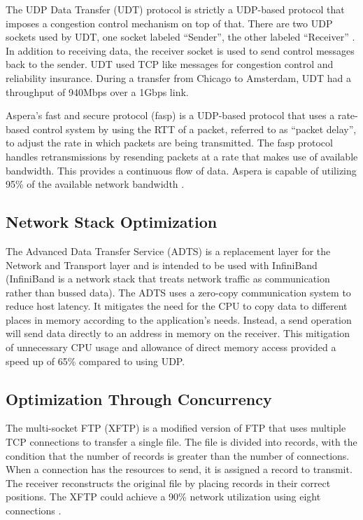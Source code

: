 The UDP Data Transfer (UDT) protocol \cite{gu2007udt} is strictly a UDP-based protocol that imposes a congestion control mechanism on top of that. There are two UDP sockets used by UDT, one socket labeled ``Sender'', the other labeled ``Receiver'' \cite{gu2007udt}. In addition to receiving data, the receiver socket is used to send control messages back to the sender. UDT used TCP like messages for congestion control and reliability insurance. During a transfer from Chicago to Amsterdam, UDT had a throughput of 940Mbps over a 1Gbps link.

Aspera's fast and secure protocol (fasp) \cite{Fan2010,Aspera2016} is a UDP-based protocol that uses a rate-based control system by using the RTT of a packet, referred to as ``packet delay'', to adjust the rate in which packets are being transmitted. The fasp protocol handles retransmissions by resending packets at a rate that makes use of available bandwidth. This provides a continuous flow of data. Aspera is capable of utilizing 95\% of the available network bandwidth \cite{Fan2010}.

\subsection{Network Stack Optimization}

The Advanced Data Transfer Service (ADTS) \cite{lai2009designing} is a replacement layer for the Network and Transport layer and is intended to be used with InfiniBand \cite{Pfister2001} (InfiniBand is a network stack that treats network traffic as communication rather than bussed data). The ADTS uses a zero-copy communication system to reduce host latency. It mitigates the need for the CPU to copy data to different places in memory according to the application's needs. Instead, a send operation will send data directly to an address in memory on the receiver. This mitigation of unnecessary CPU usage and allowance of direct memory access provided a speed up of 65\% compared to using UDP.

\subsection{Optimization Through Concurrency}

The multi-socket FTP (XFTP) \cite{Allman1995,Allman1997} is a modified version of FTP \cite{postel1980user} that uses multiple TCP connections to transfer a single file. The file is divided into records, with the condition that the number of records is greater than the number of connections. When a connection has the resources to send, it is assigned a record to transmit. The receiver reconstructs the original file by placing records in their correct positions. The XFTP could achieve a 90\% network utilization using eight connections \cite{Allman1995}.

